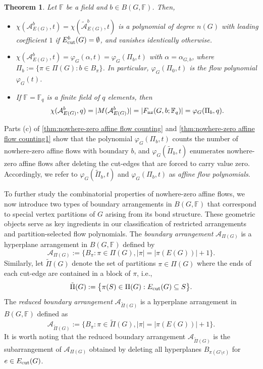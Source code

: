 \documentclass[12pt]{article}%
\renewcommand*{\bm}[1]{#1}%
\numberwithin{equation}{section}
\newtheorem{theorem}{Theorem}[section]
\begin{document}
\begin{theorem}\label{thm:nowhere-zero affine flow counting1}
Let $\mathbb{F}$ be a field and $\bm b\in B(G,\mathbb{F})$. Then,
\begin{itemize}
\item[{\rm (a)}] $\chi(\mathcal{A}_{E(G)}^{\bm b},t)=\chi(\tilde{\mathcal{A}}_{E(G)}^{\bm b},t)$ is a polynomial of degree $n(G)$ with leading coefficient $1$ if $E_{\rm cut}^{\bm b}(G)=\emptyset$, and vanishes identically otherwise. 
\item[{\rm (b)}] $\chi(\mathcal{A}_{E(G)}^{\bm b},t)=\varphi_G(\alpha,t)=\varphi_G(\Pi_{\bm b},t)$ with $\alpha=\alpha_{G,\bm b}$, where $\Pi_{\bm b}:=\big\{\pi\in\Pi(G):\bm b\in B_\pi\big\}$. In particular, $\varphi_G(\Pi_{\bm 0},t)$ is the flow polynomial $\varphi_G(t)$.
\item[{\rm (c)}]If $\mathbb{F}=\mathbb{F}_q$ is a finite field of $q$ elements,  then
\[
\chi(\mathcal{A}_{E(G)}^{\bm b},q)=|M(\mathcal{A}_{E(G)}^{\bm b})|=|F_{\rm nz}(G,\bm b;\mathbb{F}_q)|=\varphi_G(\Pi_{\bm b},q).
\]
\end{itemize}
\end{theorem}
Parts (c) of  \autoref{thm:nowhere-zero affine flow counting} and \autoref{thm:nowhere-zero affine flow counting1} show that  the polynomial $\varphi_G(\Pi_{\bm b},t)$ counts the number of nowhere-zero affine flows with boundary $\bm b$, and $\varphi_G(\tilde{\Pi}_{\bm b},t)$ enumerates nowhere-zero affine flows after deleting the cut-edges that are forced to carry value zero. Accordingly, we refer to $\varphi_G(\tilde{\Pi}_{\bm b},t)$  and $\varphi_G(\Pi_{\bm b},t)$ as {\em affine flow polynomials}.

To further study the combinatorial properties of nowhere-zero affine flows, we now introduce two types of boundary arrangements in $B(G,\mathbb{F})$ that correspond to special vertex partitions of $G$ arising from its bond structure. These geometric objects serve as key ingredients in our classification of restricted arrangements and  partition-selected flow polynomials.  The {\em boundary arrangement} $\mathcal{A}_{\Pi(G)}$  is a hyperplane arrangement in $B(G,\mathbb{F})$ defined by 
\[
\mathcal{A}_{\Pi(G)}:=\big\{B_\pi:\pi\in\Pi(G), |\pi|=|\pi(E(G))|+1\big\}.
\]
Similarly, let $\tilde{\Pi}(G)$ denote the set of partitions $\pi\in\Pi(G)$ where the ends of each cut-edge are contained in a block of $\pi$, i.e.,
\[
\tilde{\Pi}(G):=\big\{\pi(S)\in \Pi(G):E_{\rm cut}(G)\subseteq S\big\}.
\]
The {\em reduced boundary arrangement} $\mathcal{A}_{\tilde{\Pi}(G)}$ is a hyperplane arrangement in $B(G,\mathbb{F})$ defined as  
\[
\mathcal{A}_{\tilde{\Pi}(G)}:=\big\{B_\pi:\pi\in\tilde{\Pi}(G), |\pi|=|\pi(E(G))|+1\big\}.
\]
It is worth noting that the reduced boundary arrangement $\mathcal{A}_{\tilde{\Pi}(G)}$ is the subarrangement  of $\mathcal{A}_{\Pi(G)}$ obtained by deleting all hyperplanes $B_{\pi(G\setminus e)}$ for $e\in E_{\rm cut}(G)$.
\end{document}
